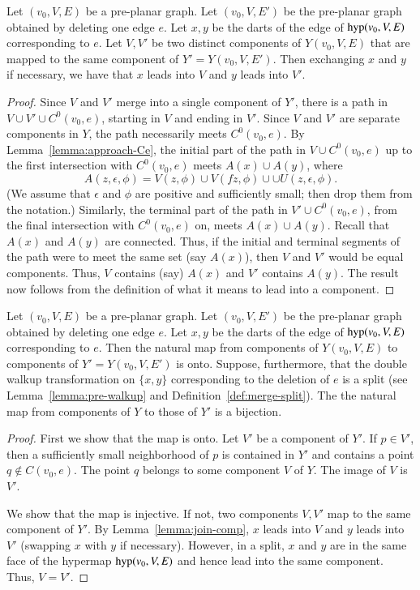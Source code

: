 \begin{lemma}\label{lemma:join-comp}
Let $(v_0,V,E)$ be a pre-planar graph.  Let $(v_0,V,E')$
be the pre-planar graph obtained by deleting one edge $e$.
Let $x,y$ be the darts of the edge of
${\operatorname{hyp}}(v_0,V,E)$ corresponding
to $e$.
Let $V,V'$ be two distinct
components of $Y(v_0,V,E)$ that are mapped
to the same component of $Y'=Y(v_0,V,E')$.  Then exchanging
$x$ and $y$ if necessary, we have that $x$ leads into $V$
and $y$ leads into $V'$.
\end{lemma}

\begin{proof}
Since $V$ and $V'$ merge into a single component of $Y'$,
there is a path in $V\cup V'\cup C^0(v_0,e)$, starting in $V$
and ending in $V'$.  Since $V$ and $V'$ are separate components
in $Y$, the path necessarily meets $C^0(v_0,e)$.
By Lemma~\ref{lemma:approach-Ce}, the
initial part of the path in $V\cup C^0(v_0,e)$ up to the first
intersection with $C^0(v_0,e)$ meets $A(x)\cup A(y)$, where
  $$
  A(z,\epsilon,\phi) = 
    V(z,\phi) \cup V(f z,\phi)\cup 
  \cup U(z,\epsilon,\phi).
  $$
(We assume that $\epsilon$ and $\phi$ are positive and sufficiently
small; then drop them from the notation.)
Similarly, the terminal part of the path in $V'\cup C^0(v_0,e)$, 
from the
final intersection with $C^0(v_0,e)$ on, meets $A(x)\cup A(y)$.
Recall that $A(x)$ and $A(y)$ are connected.  Thus,
if the initial and terminal segments of the path were to
meet the
same set (say $A(x)$), then $V$ and $V'$ would be equal components.
Thus, $V$ contains (say) $A(x)$ and $V'$ contains $A(y)$.
The result now follows from the definition of what it means
to lead into a component.
\end{proof}


\begin{lemma}
Let $(v_0,V,E)$ be a pre-planar graph.  Let $(v_0,V,E')$
be the pre-planar graph obtained by deleting one edge $e$.
Let $x,y$ be the darts of the edge of
${\operatorname{hyp}}(v_0,V,E)$ corresponding
to $e$.  Then
the natural map from components of $Y(v_0,V,E)$ to components
of $Y'=Y(v_0,V,E')$ is onto.
Suppose, furthermore, that the double walkup transformation
on $\{x,y\}$ corresponding to the deletion of $e$ is a split
(see Lemma~\ref{lemma:pre-walkup} 
and Definition~\ref{def:merge-split}).  
The the natural map from components of $Y$ to those of $Y'$ is a bijection.
\end{lemma}

\begin{proof}
First we show that the map is onto.  Let $V'$
be a component of $Y'$.  If $p\in V'$,
then a sufficiently small neighborhood of $p$ is contained
in $Y'$ and contains a point $q\not\in C(v_0,e)$.  The
point $q$ belongs to some component $V$ of $Y$.  The image
of $V$ is $V'$.

We show that the map is injective.  If not, two
components $V,V'$ map to the same component of $Y'$.
By Lemma~\ref{lemma:join-comp}, $x$ leads into $V$ and
$y$ leads into $V'$ (swapping $x$ with $y$ if necessary).
However, in a split, $x$ and $y$ are in the same face of
the hypermap ${\operatorname{hyp}}(v_0,V,E)$ and hence lead into the
same component.  Thus, $V=V'$.
\end{proof}

